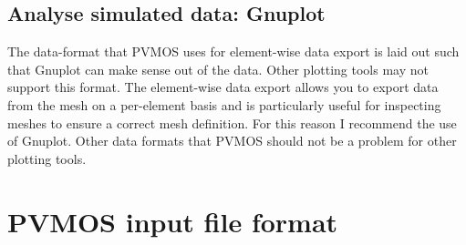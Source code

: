 \documentclass[noshowpacs,preprintnumbers,amsmath,amssymb, letter]{revtex4}
\begin{document}
\subsection{Analyse simulated data: Gnuplot}
The data-format that PVMOS uses for element-wise data export is laid out such that Gnuplot can make sense out of the data. Other plotting tools may not support this format. The element-wise data export allows you to export data from the mesh on a per-element basis and is particularly useful for inspecting meshes to ensure a correct mesh definition. For this reason I recommend the use of Gnuplot. Other data formats that PVMOS should not be a problem for other plotting tools.

\section{\label{syntax}PVMOS input file format}
\end{document}
